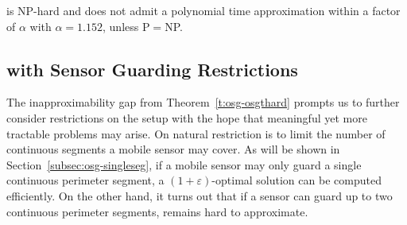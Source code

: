 \begin{theorem}\label{t:osg-osgthard}
\osgt is NP-hard and does not admit a polynomial time approximation 
within a factor of $\alpha$ with $\alpha = 1.152$, unless 
P$=$NP.
\end{theorem}

\subsection{\opgt with Sensor Guarding Restrictions}\label{subsec:osg-2-seghard}
The inapproximability gap from Theorem~\ref{t:osg-osgthard} prompts us to 
further consider restrictions on the setup with the hope that meaningful 
yet more tractable problems may arise. On natural restriction is to 
limit the number of continuous segments a mobile sensor may cover. As 
will be shown in Section~\ref{subsec:osg-singleseg}, if a mobile sensor may 
only guard a single continuous perimeter segment, a 
$(1 + \varepsilon)$-optimal solution can be computed efficiently. 
On the other hand, it turns out that if a sensor can guard up to two 
continuous perimeter segments, \opgt remains hard to approximate. 

